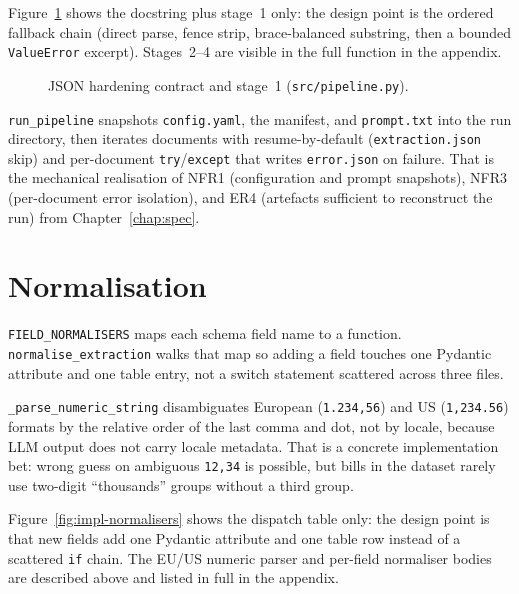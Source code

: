 Figure~\ref{fig:impl-json-parse} shows the docstring plus stage~1 only:
the design point is the ordered fallback chain (direct parse, fence
strip, brace-balanced substring, then a bounded \texttt{ValueError}
excerpt). Stages~2--4 are visible in the full function in the appendix.

\begin{figure}[ht]
    \centering
    \caption{JSON hardening contract and stage~1 (\texttt{src/pipeline.py}).}
    \label{fig:impl-json-parse}
\end{figure}

\texttt{run\_pipeline} snapshots \texttt{config.yaml}, the manifest,
and \texttt{prompt.txt} into the run directory, then iterates
documents with resume-by-default (\texttt{extraction.json} skip)
and per-document \texttt{try}/\texttt{except} that writes
\texttt{error.json} on failure. That is the mechanical realisation of
NFR1 (configuration and prompt snapshots), NFR3 (per-document error
isolation), and ER4 (artefacts sufficient to reconstruct the run)
from Chapter~\ref{chap:spec}.


\section{Normalisation}
\label{sec:impl-normalisation}

\texttt{FIELD\_NORMALISERS} maps each schema field name to a
function. \texttt{normalise\_extraction} walks that map so adding a
field touches one Pydantic attribute and one table entry, not a
switch statement scattered across three files.

\texttt{\_parse\_numeric\_string} disambiguates European
(\texttt{1.234,56}) and US (\texttt{1,234.56}) formats by the
relative order of the last comma and dot, not by locale, because LLM
output does not carry locale metadata. That is a concrete
implementation bet: wrong guess on ambiguous \texttt{12,34} is
possible, but bills in the dataset rarely use two-digit
``thousands'' groups without a third group.

Figure~\ref{fig:impl-normalisers} shows the dispatch table only: the
design point is that new fields add one Pydantic attribute and one
table row instead of a scattered \texttt{if} chain. The EU/US numeric
parser and per-field normaliser bodies are described above and listed
in full in the appendix.

